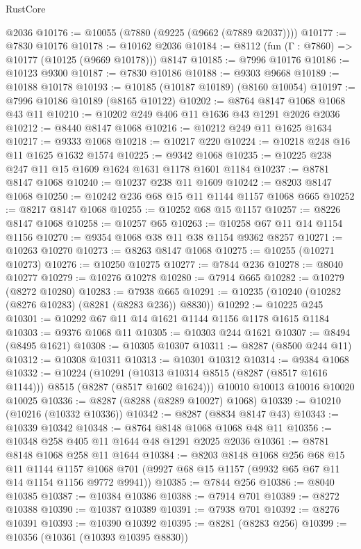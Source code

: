 \begin{lexlean}{RustCore}
\begin{coremodule}
    @2036
@10176 := @10055 (@7880 (@9225 (@9662 (@7889 @2037))))
@10177 := @7830 @10176
@10178 := @10162 @2036
@10184 := @8112 (fun (Γ : @7860) => @10177 (@10125 (@9669 @10178))) @8147
@10185 := @7996 @10176
@10186 := @10123 @9300
@10187 := @7830 @10186
@10188 := @9303 @9668
@10189 := @10188 @10178
@10193 := @10185 (@10187 @10189) (@8160 @10054)
@10197 := @7996 @10186 @10189 (@8165 @10122)
@10202 := @8764 @8147 @1068 @1068 @43 @11
@10210 := @10202 @249 @406 @11 @1636 @43 @1291 @2026 @2036
@10212 := @8440 @8147 @1068
@10216 := @10212 @249 @11 @1625 @1634
@10217 := @9333 @1068
@10218 := @10217 @220
@10224 := @10218 @248 @16 @11 @1625 @1632 @1574
@10225 := @9342 @1068
@10235 := @10225 @238 @247 @11 @15 @1609 @1624 @1631 @1178 @1601 @1184
@10237 := @8781 @8147 @1068
@10240 := @10237 @238 @11 @1609
@10242 := @8203 @8147 @1068
@10250 := @10242 @236 @68 @15 @11 @1144 @1157 @1068 @665
@10252 := @8217 @8147 @1068
@10255 := @10252 @68 @15 @1157
@10257 := @8226 @8147 @1068
@10258 := @10257 @65
@10263 := @10258 @67 @11 @14 @1154 @1156
@10270 := @9354 @1068 @38 @11 @38 @1154 @9362 @8257
@10271 := @10263 @10270
@10273 := @8263 @8147 @1068
@10275 := @10255 (@10271 @10273)
@10276 := @10250 @10275
@10277 := @7844 @236
@10278 := @8040 @10277
@10279 := @10276 @10278
@10280 := @7914 @665
@10282 := @10279 (@8272 @10280)
@10283 := @7938 @665
@10291 := @10235 (@10240 (@10282 (@8276 @10283) (@8281 (@8283 @236)) @8830))
@10292 := @10225 @245
@10301 := @10292 @67 @11 @14 @1621 @1144 @1156 @1178 @1615 @1184
@10303 := @9376 @1068 @11
@10305 := @10303 @244 @1621
@10307 := @8494 (@8495 @1621)
@10308 := @10305 @10307
@10311 := @8287 (@8500 @244 @11)
@10312 := @10308 @10311
@10313 := @10301 @10312
@10314 := @9384 @1068
@10332 := @10224
    (@10291 (@10313 @10314 @8515 (@8287 (@8517 @1616 @1144))) @8515 (@8287 (@8517 @1602 @1624)))
    @10010
    @10013
    @10016
    @10020
    @10025
@10336 := @8287 (@8288 (@8289 @10027) @1068)
@10339 := @10210 (@10216 (@10332 @10336))
@10342 := @8287 (@8834 @8147 @43)
@10343 := @10339 @10342
@10348 := @8764 @8148 @1068 @1068 @48 @11
@10356 := @10348 @258 @405 @11 @1644 @48 @1291 @2025 @2036
@10361 := @8781 @8148 @1068 @258 @11 @1644
@10384 := @8203
    @8148
    @1068
    @256
    @68
    @15
    @11
    @1144
    @1157
    @1068
    @701
    (@9927 @68 @15 @1157 (@9932 @65 @67 @11 @14 @1154 @1156 @9772 @9941))
@10385 := @7844 @256
@10386 := @8040 @10385
@10387 := @10384 @10386
@10388 := @7914 @701
@10389 := @8272 @10388
@10390 := @10387 @10389
@10391 := @7938 @701
@10392 := @8276 @10391
@10393 := @10390 @10392
@10395 := @8281 (@8283 @256)
@10399 := @10356 (@10361 (@10393 @10395 @8830))

\end{coremodule}
\end{lexlean}
